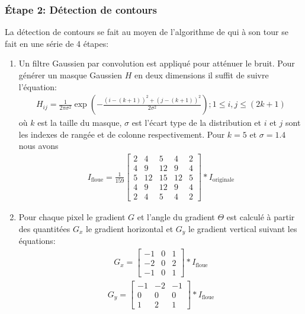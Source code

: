 \subsubsection{Étape 2: Détection de contours} La détection de contours se fait au moyen de l'algorithme de \citep{Canny1986} qui à son tour se fait en une série de 4 étapes:

\begin{enumerate}
  \item Un filtre Gaussien par convolution est appliqué pour atténuer le bruit. Pour générer un masque Gaussien $H$ en deux dimensions il suffit de suivre l'équation:
  \begin{align}
    H_{ij}= \frac{1}{2\pi\sigma^2}\exp \left(-\frac{(i-(k+1))^2+(j-(k+1))^2}{2\sigma^2} \right) ; 1 \leq i, j \leq (2k + 1)
  \end{align}
  où $k$ est la taille du masque, $\sigma$ est l'écart type de la distribution et $i$ et $j$ sont les indexes de rangée et de colonne respectivement. Pour $k = 5$ et $\sigma = 1.4$ nous avons
  \begin{align}
    I_{\text{floue}} = \frac{1}{159} \begin{bmatrix}
      2 & 4 & 5 & 4 & 2\\
      4 & 9 & 12 & 9 & 4\\
      5 & 12 & 15 & 12 & 5\\
      4 & 9 & 12 & 9 & 4\\
      2 & 4 & 5 & 4 & 2
    \end{bmatrix} * I_{\text{originale}}
  \end{align}
  \item Pour chaque pixel le gradient $G$ et l'angle du gradient $\Theta$ est calculé à partir des quantitées $G_x$ le gradient horizontal et $G_y$ le gradient vertical suivant les équations:
  \begin{align}
    G_x =  \begin{bmatrix} -1 & 0 & 1 \\
    -2 & 0 & 2 \\
    -1 & 0 & 1
  \end{bmatrix} * I_{\text{floue}}
  \end{align}
  \begin{align}
    G_y = \begin{bmatrix}
    -1 & -2 & -1\\
    0 & 0 & 0 \\
    1 & 2 & 1
  \end{bmatrix} * I_{\text{floue}}
  \end{align}

\end{enumerate}
